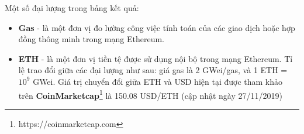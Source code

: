 \documentclass[../main-report.tex]{subfiles}
\begin{document}
Một số đại lượng trong bảng kết quả:

\begin{itemize}
\item \textbf{Gas} - là một đơn vị đo lường công việc tính toán của các giao dịch hoặc hợp đồng thông minh trong mạng Ethereum.
\item \textbf{ETH} - là một đơn vị tiền tệ được sử dụng nội bộ trong mạng Ethereum. Tỉ lệ trao đổi giữa các đại lượng như sau: giá gas là 2 GWei/gas, và 1 ETH = $10^9$ GWei. Giá trị chuyển đổi giữa ETH và USD hiện tại được tham khảo trên \textbf{CoinMarketcap}\footnote{https://coinmarketcap.com} là 150.08 USD/ETH (cập nhật ngày 27/11/2019)
\end{itemize}

\end{document}
